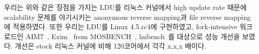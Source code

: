 
\ifkor
우리는 위와 같은 장점을 가지는 LDU를 리눅스 커널에서 high update rate 때문에 scalability 문제를 야기시키는
anonymous reverse mapping과 file reverse mapping에 적용하였다.
또한 우리는 LDU를 Linux 4.5.rc4에 구현하였고, fork-intensive 워크로드인
AIM7~\cite{AIM7Benchmark}, Exim~\cite{Exim} from MOSBENCH~\cite{MOSBENCH},
lmbench~\cite{mcvoy1996lmbench}를 대상으로 성능 개선을 보였다. 개선은 stock 리눅스 커널에 비해 120코어에서
각각 x,x,x 배이다.
\else
\fi


